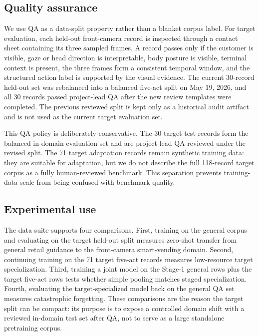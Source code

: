 \subsection{Quality assurance}

We use QA as a data-split property rather than a blanket corpus label. For target evaluation, each held-out front-camera record is inspected through a contact sheet containing its three sampled frames. A record passes only if the customer is visible, gaze or head direction is interpretable, body posture is visible, terminal context is present, the three frames form a consistent temporal window, and the structured action label is supported by the visual evidence. The current 30-record held-out set was rebalanced into a balanced five-act split on May 19, 2026, and all 30 records passed project-lead QA after the new review templates were completed. The previous reviewed split is kept only as a historical audit artifact and is not used as the current target evaluation set.

This QA policy is deliberately conservative. The 30 target test records form the balanced in-domain evaluation set and are project-lead QA-reviewed under the revised split. The 71 target adaptation records remain synthetic training data: they are suitable for adaptation, but we do not describe the full 118-record target corpus as a fully human-reviewed benchmark. This separation prevents training-data scale from being confused with benchmark quality.

\subsection{Experimental use}

The data suite supports four comparisons. First, training on the general corpus and evaluating on the target held-out split measures zero-shot transfer from general retail guidance to the front-camera smart-vending domain. Second, continuing training on the 71 target five-act records measures low-resource target specialization. Third, training a joint model on the Stage-1 general rows plus the target five-act rows tests whether simple pooling matches staged specialization. Fourth, evaluating the target-specialized model back on the general QA set measures catastrophic forgetting. These comparisons are the reason the target split can be compact: its purpose is to expose a controlled domain shift with a reviewed in-domain test set after QA, not to serve as a large standalone pretraining corpus.
